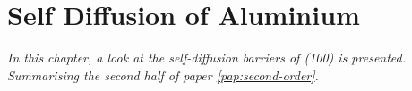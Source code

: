 \chapter{Self Diffusion of Aluminium}
\label{chap:al}

\textit{In this chapter, a look at the self-diffusion barriers of (100) is presented.
Summarising the second half of paper \ref{pap:second-order}.}


%

